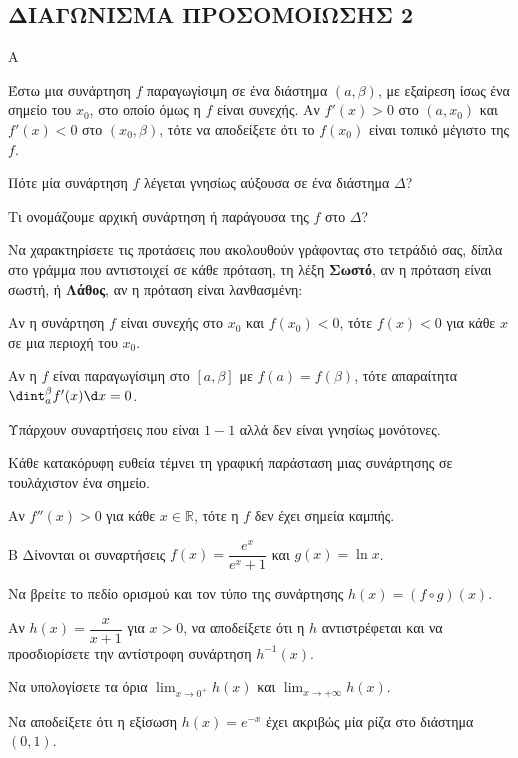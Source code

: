 \subsection{ΔΙΑΓΩΝΙΣΜΑ ΠΡΟΣΟΜΟΙΩΣΗΣ 2}
\begin{thema}{Α}
\begin{erwthma}
    \item Έστω μια συνάρτηση $f$ παραγωγίσιμη σε ένα διάστημα $(a, \beta)$, με εξαίρεση ίσως ένα σημείο του $x_0$, στο οποίο όμως η $f$ είναι συνεχής. Αν $f'(x) > 0$ στο $(a, x_0)$ και $f'(x) < 0$ στο $(x_0, \beta)$, τότε να αποδείξετε ότι το $f(x_0)$ είναι τοπικό μέγιστο της $f$. 
    \item Πότε μία συνάρτηση $f$ λέγεται γνησίως αύξουσα σε ένα διάστημα $\Delta$? 
    \item Τι ονομάζουμε αρχική συνάρτηση ή παράγουσα της $f$ στο $\Delta$? 
    \item Να χαρακτηρίσετε τις προτάσεις που ακολουθούν γράφοντας στο τετράδιό σας, δίπλα στο γράμμα που αντιστοιχεί σε κάθε πρόταση, τη λέξη \textbf{Σωστό},
αν η πρόταση είναι σωστή, ή \textbf{Λάθος}, αν η πρόταση είναι λανθασμένη:
    \begin{alist}
        \item Αν η συνάρτηση $f$ είναι συνεχής στο $x_0$ και $f(x_0) < 0$, τότε $f(x) < 0$ για κάθε $x$ σε μια περιοχή του $x_0$.
        \item Αν η $f$ είναι παραγωγίσιμη στο $[a, \beta]$ με $f(a) = f(\beta)$, τότε απαραίτητα $\dint_{a}^{\beta} f'(x) \d x = 0$.
        \item Υπάρχουν συναρτήσεις που είναι $1-1$ αλλά δεν είναι γνησίως μονότονες.
        \item Κάθε κατακόρυφη ευθεία τέμνει τη γραφική παράσταση μιας συνάρτησης σε τουλάχιστον ένα σημείο.
        \item Αν $f''(x) > 0$ για κάθε $x \in \mathbb{R}$, τότε η $f$ δεν έχει σημεία καμπής.
    \end{alist} 
\end{erwthma}
\end{thema}
\begin{thema}{Β}
Δίνονται οι συναρτήσεις $f(x) = \dfrac{e^x}{e^x + 1}$ και $g(x) = \ln x$.
\begin{erwthma}
    \item Να βρείτε το πεδίο ορισμού και τον τύπο της συνάρτησης $h(x) = (f \circ g)(x)$. 
    \item Αν $h(x) = \dfrac{x}{x+1}$ για $x > 0$, να αποδείξετε ότι η $h$ αντιστρέφεται και να προσδιορίσετε την αντίστροφη συνάρτηση $h^{-1}(x)$. 
    \item Να υπολογίσετε τα όρια $\displaystyle\lim_{x \to 0^+} h(x)$ και $\displaystyle\lim_{x \to +\infty} h(x)$. 
    \item Να αποδείξετε ότι η εξίσωση $h(x) = e^{-x}$ έχει ακριβώς μία ρίζα στο διάστημα $(0, 1)$. 
\end{erwthma}
\end{thema}

